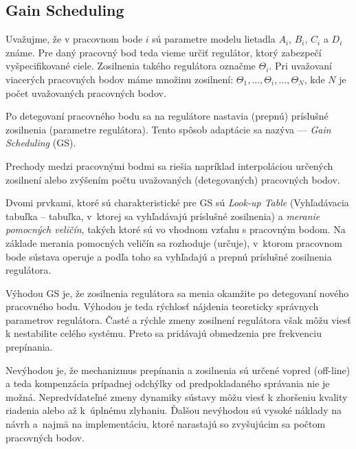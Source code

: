 \documentclass[a4paper, 10pt, ]{article}
\begin{document}
\subsection{Gain Scheduling}

Uvažujme, že v pracovnom bode $i$ sú parametre modelu lietadla $A_i$, $B_i$, $C_i$ a $D_i$ známe. Pre daný pracovný bod teda vieme určiť regulátor, ktorý zabezpečí vyšpecifikované ciele. Zosilnenia takého regulátora označme $\Theta_i$. Pri uvažovaní viacerých pracovných bodov máme množinu zosilnení: $\Theta_1,\ldots, \Theta_i,\ldots, \Theta_N$, kde $N$ je počet uvažovaných pracovných bodov.

Po detegovaní pracovného bodu sa na regulátore nastavia (prepnú) príslušné zosilnenia (parametre regulátora). Tento spôsob adaptácie sa nazýva  --- \emph{Gain Scheduling} (GS).

Prechody medzi pracovnými bodmi sa riešia napríklad interpoláciou určených zosilnení alebo zvýšením počtu uvažovaných (detegovaných) pracovných bodov.

Dvomi prvkami, ktoré sú charakteristické pre GS sú \emph{Look-up Table} (Vyhľadávacia tabuľka -- tabuľka, v~ktorej sa vyhľadávajú príslušné zosilnenia) a \emph{meranie pomocných veličín}, takých ktoré sú vo vhodnom vzťahu s pracovným bodom. Na základe merania pomocných veličín sa rozhoduje (určuje), v~ktorom pracovnom bode sústava operuje a podľa toho sa vyhľadajú a prepnú príslušné zosilnenia regulátora.

Výhodou GS je, že zosilnenia regulátora sa menia okamžite po detegovaní nového pracovného bodu. Výhodou je teda rýchlosť nájdenia teoreticky správnych parametrov regulátora. Časté a rýchle zmeny zosilnení regulátora však môžu viesť k nestabilite celého systému. Preto sa pridávajú obmedzenia pre frekvenciu prepínania.

Nevýhodou je, že mechanizmus prepínania a zosilnenia sú určené vopred (off-line) a teda kompenzácia prípadnej odchýlky od predpokladaného správania nie je možná. Nepredvídateľné zmeny dynamiky sústavy môžu viesť k zhoršeniu kvality riadenia alebo až k~úplnému zlyhaniu. Ďalšou nevýhodou sú vysoké náklady na návrh a~najmä na implementáciu, ktoré narastajú so zvyšujúcim sa počtom pracovných bodov.
\end{document}
